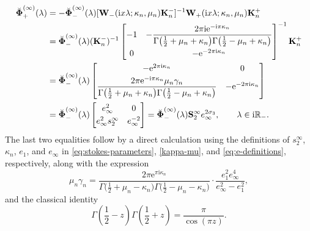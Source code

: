 \documentclass[11pt]{article}
\numberwithin{equation}{section}
\numberwithin{equation}{section}
\newcommand{\ee}{\mathrm{e}}
\newcommand{\ii}{\mathrm{i}}
\newcommand{\para}[1]{\breve{#1}}
\begin{document}
\begin{align*}
 \para{\boldsymbol{\Phi}}_+^{(\infty)}(\lambda)&=-\para{\boldsymbol{\Phi}}_-^{(\infty)}(\lambda)[\mathbf{W}_{-}(\ii x\lambda;\kappa_n,\mu_n)\mathbf{K}_n^-]^{-1}\mathbf{W}_{+}(\ii x\lambda;\kappa_n,\mu_n)\mathbf{K}_n^+\\
 &=\para{\boldsymbol{\Phi}}_-^{(\infty)}(\lambda)(\mathbf{K}^-_n)^{-1}\begin{bmatrix}
 -1 & \displaystyle -\frac{2\pi \ii\ee^{-\ii\pi\kappa_n}}{\Gamma\big(\frac{1}{2}+\mu_n+\kappa_n\big)\Gamma\big(\frac{1}{2}-\mu_n+\kappa_n\big)}\vspace{1mm}\\
 0 & -\ee^{-2\pi \ii\kappa_n}
 \end{bmatrix}^{-1}\mathbf{K}_n^+\\
 &=\para{\boldsymbol{\Phi}}_-^{(\infty)}(\lambda)\begin{bmatrix}
 -\ee^{2\pi \ii\kappa_n} & 0\vspace{1mm}\\
 \displaystyle \frac{2\pi \ee^{-\ii\pi\kappa_n}\mu_n\gamma_n }{\Gamma\big(\frac{1}{2}+\mu_n+\kappa_n\big)\Gamma\big(\frac{1}{2}-\mu_n+\kappa_n\big)} &-\ee^{-2\pi \ii\kappa_n}
 \end{bmatrix} \\
 &= \para{\boldsymbol{\Phi}}_-^{(\infty)}(\lambda) \begin{bmatrix}e_{\infty}^{2}&0 \vspace{1mm}\\ e_\infty^2s_2^\infty&e_{\infty}^{-2}\end{bmatrix} = \para{\boldsymbol{\Phi}}_-^{(\infty)}(\lambda) \mathbf{S}_2^\infty e_\infty^{2\sigma_3}, \qquad \lambda\in\mathrm{i}\mathbb{R}_-.
\end{align*}
The last two equalities follow by a direct calculation using the definitions of $s_2^\infty$, $\kappa_n$, $e_1$, and $e_\infty$ in \eqref{eq:stokes-parameters}, \eqref{kappa-mu}, and \eqref{eq:e-definitions}, respectively, along with the expression
\begin{equation} \label{Qinfty-gammainfty}
 \mu_n \gamma_n = \dfrac{2\pi \ee^{\pi \ii \kappa_n}}{\Gamma\big( \frac{1}{2} + \mu_n - \kappa_n\big)\Gamma\big( \frac{1}{2} - \mu_n - \kappa_n\big)} \cdot \frac{e_1^2 e_\infty^4}{e_\infty^2 - e_1^2},
\end{equation}
and the classical identity
\begin{equation}
\label{eq:Gamma-reflection}
\Gamma \left(\frac{1}{2} - z \right) \Gamma \left(\frac{1}{2} + z \right) = \dfrac{\pi }{\cos(\pi z)}.
\end{equation}
\end{document}
